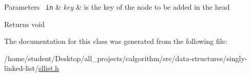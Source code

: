 \begin{DoxyParams}[1]{Parameters}
\mbox{\texttt{ in}}  & {\em key} & is the key of the node to be added in the head \\
\hline
\end{DoxyParams}
\begin{DoxyReturn}{Returns}
void 
\end{DoxyReturn}


The documentation for this class was generated from the following file\+:\begin{DoxyCompactItemize}
\item 
/home/student/\+Desktop/all\+\_\+projects/calgorithm/src/data-\/structures/singly-\/linked-\/list/\mbox{\hyperlink{sllist_8h}{sllist.\+h}}\end{DoxyCompactItemize}
